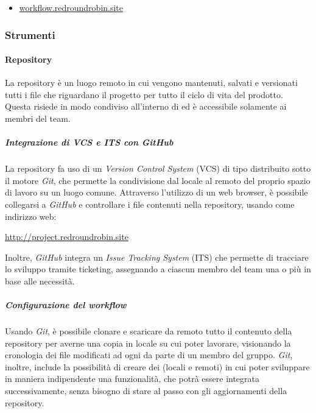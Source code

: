 	\begin{itemize}
		\item \href{https://workflow.redroundrobin.site}{workflow.redroundrobin.site}
	\end{itemize}


\subsubsection{Strumenti}

	\paragraph{Repository}

	La repository è un luogo remoto in cui vengono mantenuti, salvati e versionati tutti i file che riguardano il progetto per tutto il ciclo di vita del prodotto. Questa risiede in modo condiviso all'interno di  ed è accessibile solamente ai membri del team.

		\subparagraph{Integrazione di VCS e ITS con GitHub}

		La repository fa uso di un \textit{Version Control System} (VCS) di tipo distribuito sotto il motore \textit{Git}, che permette la condivisione dal locale al remoto del proprio spazio di lavoro su un luogo comune. Attraverso l'utilizzo di un web browser, è possibile collegarsi a \textit{GitHub} e controllare i file contenuti nella repository, usando come indirizzo web:

		\href{http://project.redroundrobin.site}{http://project.redroundrobin.site}

		Inoltre, \textit{GitHub} integra un \textit{Issue Tracking System} (ITS) che permette di tracciare lo sviluppo tramite ticketing, assegnando a ciascun membro del team una o più  in base alle necessità.

		\subparagraph{Configurazione del workflow}

		Usando \textit{Git}, è possibile clonare e scaricare da remoto tutto il contenuto della repository per averne una copia in locale su cui poter lavorare, visionando la cronologia dei file modificati ad ogni  da parte di un membro del gruppo.
		\textit{Git}, inoltre, include la possibilità di creare dei  (locali e remoti) in cui poter sviluppare in maniera indipendente una funzionalità, che potrà essere integrata successivamente, senza bisogno di stare al passo con gli aggiornamenti della repository.

